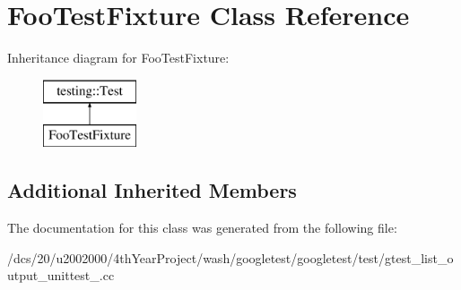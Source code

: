 \hypertarget{classFooTestFixture}{}\section{Foo\+Test\+Fixture Class Reference}
\label{classFooTestFixture}
Inheritance diagram for Foo\+Test\+Fixture\+:\begin{figure}[H]
\begin{center}
\leavevmode
\includegraphics[height=2.000000cm]{classFooTestFixture}
\end{center}
\end{figure}
\subsection*{Additional Inherited Members}


The documentation for this class was generated from the following file\+:\begin{DoxyCompactItemize}
\item 
/dcs/20/u2002000/4th\+Year\+Project/wash/googletest/googletest/test/gtest\+\_\+list\+\_\+output\+\_\+unittest\+\_\+.\+cc\end{DoxyCompactItemize}
